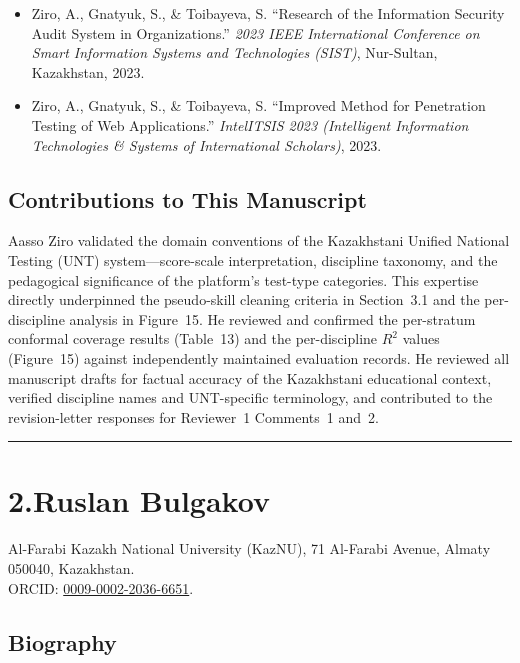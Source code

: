 \documentclass[11pt]{article}
\begin{document}
\begin{itemize}
  \item Ziro, A., Gnatyuk, S., \& Toibayeva, S.
    ``Research of the Information Security Audit System in Organizations.''
    \textit{2023 IEEE International Conference on Smart Information Systems and
    Technologies (SIST)}, Nur-Sultan, Kazakhstan, 2023.
  \item Ziro, A., Gnatyuk, S., \& Toibayeva, S.
    ``Improved Method for Penetration Testing of Web Applications.''
    \textit{IntelITSIS 2023 (Intelligent Information Technologies \&
    Systems of International Scholars)}, 2023.
\end{itemize}

\subsection*{Contributions to This Manuscript}

Aasso Ziro validated the domain conventions of the Kazakhstani Unified National
Testing (UNT) system---score-scale interpretation, discipline taxonomy, and the
pedagogical significance of the platform's test-type categories.
This expertise directly underpinned the pseudo-skill cleaning criteria in
Section~3.1 and the per-discipline analysis in Figure~15.
He reviewed and confirmed the per-stratum conformal coverage results (Table~13) and
the per-discipline $R^{2}$ values (Figure~15) against independently maintained
evaluation records.
He reviewed all manuscript drafts for factual accuracy of the Kazakhstani educational
context, verified discipline names and UNT-specific terminology, and contributed to
the revision-letter responses for Reviewer~1 Comments~1 and~2.

\bigskip\hrule\bigskip

\section*{2.\quad Ruslan Bulgakov}

\noindent
Al-Farabi Kazakh National University (KazNU),
71 Al-Farabi Avenue, Almaty 050040, Kazakhstan.\\
ORCID: \href{https://orcid.org/0009-0002-2036-6651}{0009-0002-2036-6651}.

\subsection*{Biography}
\end{document}
